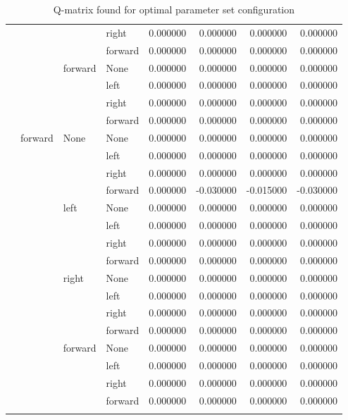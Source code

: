 \documentclass{article}
\begin{document}
\begin{longtable}{llllrrrr}
      &      &      & right &  0.000000 &  0.000000 &  0.000000 &  0.000000 \\
      &      &      & forward &  0.000000 &  0.000000 &  0.000000 &  0.000000 \\
      &      & forward & None &  0.000000 &  0.000000 &  0.000000 &  0.000000 \\
      &      &      & left &  0.000000 &  0.000000 &  0.000000 &  0.000000 \\
      &      &      & right &  0.000000 &  0.000000 &  0.000000 &  0.000000 \\
      &      &      & forward &  0.000000 &  0.000000 &  0.000000 &  0.000000 \\
      & forward & None & None &  0.000000 &  0.000000 &  0.000000 &  0.000000 \\
      &      &      & left &  0.000000 &  0.000000 &  0.000000 &  0.000000 \\
      &      &      & right &  0.000000 &  0.000000 &  0.000000 &  0.000000 \\
      &      &      & forward &  0.000000 & -0.030000 & -0.015000 & -0.030000 \\
      &      & left & None &  0.000000 &  0.000000 &  0.000000 &  0.000000 \\
      &      &      & left &  0.000000 &  0.000000 &  0.000000 &  0.000000 \\
      &      &      & right &  0.000000 &  0.000000 &  0.000000 &  0.000000 \\
      &      &      & forward &  0.000000 &  0.000000 &  0.000000 &  0.000000 \\
      &      & right & None &  0.000000 &  0.000000 &  0.000000 &  0.000000 \\
      &      &      & left &  0.000000 &  0.000000 &  0.000000 &  0.000000 \\
      &      &      & right &  0.000000 &  0.000000 &  0.000000 &  0.000000 \\
      &      &      & forward &  0.000000 &  0.000000 &  0.000000 &  0.000000 \\
      &      & forward & None &  0.000000 &  0.000000 &  0.000000 &  0.000000 \\
      &      &      & left &  0.000000 &  0.000000 &  0.000000 &  0.000000 \\
      &      &      & right &  0.000000 &  0.000000 &  0.000000 &  0.000000 \\
      &      &      & forward &  0.000000 &  0.000000 &  0.000000 &  0.000000 \\
\caption{Q-matrix found for optimal parameter set configuration}
\end{longtable}
\end{document}
